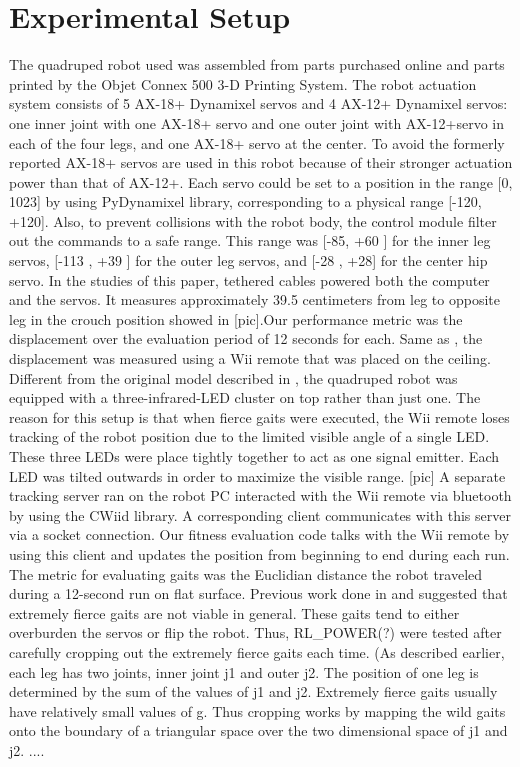 \section{Experimental Setup}

The quadruped robot used was assembled from parts purchased online and
parts printed by the Objet Connex 500 3-D Printing System. The robot
actuation system consists of 5 AX-18+ Dynamixel servos and 4 AX-12+
Dynamixel servos: one inner joint with one AX-18+ servo and one outer
joint with AX-12+servo in each of the four legs, and one AX-18+ servo
at the center. To avoid the formerly reported AX-18+ servos are used
in this robot because of their stronger actuation power than that of
AX-12+. Each servo could be set to a position in the range [0, 1023]
by using PyDynamixel library, corresponding to a physical range [-120,
  +120]. Also, to prevent collisions with the robot body, the control
module filter out the commands to a safe range. This range was [-85,
  +60 ] for the inner leg servos, [-113 , +39 ] for the outer leg
servos, and [-28 , +28] for the center hip servo. In the studies of
this paper, tethered cables powered both the computer and the
servos. It measures approximately 39.5 centimeters from leg to
opposite leg in the crouch position showed in [pic].Our performance
metric was the displacement over the evaluation period of 12 seconds
for each. Same as \cite{yosinski2011evolving-robot-gaits}, the displacement was
measured using a Wii remote that was placed on the ceiling. Different
from the original model described in \cite{yosinski2011evolving-robot-gaits}, the quadruped robot was
equipped with a three-infrared-LED cluster on top rather than just
one. The reason for this setup is that when fierce gaits were
executed, the Wii remote loses tracking of the robot position due to
the limited visible angle of a single LED.  These three LEDs were
place tightly together to act as one signal emitter. Each LED was
tilted outwards in order to maximize the visible range. [pic] A
separate tracking server ran on the robot PC interacted with the Wii
remote via bluetooth by using the CWiid library.  A corresponding
client communicates with this server via a socket connection. Our
fitness evaluation code talks with the Wii remote by using this client
and updates the position from beginning to end during each run. The
metric for evaluating gaits was the Euclidian distance the robot
traveled during a 12-second run on flat surface. Previous work done in
\cite{yosinski2011evolving-robot-gaits} and \cite{clune2009evolving-coordinated-quadruped} suggested that extremely fierce gaits are not viable in
general. These gaits tend to either overburden the servos or flip the
robot. Thus, RL\_POWER(?) were tested after carefully cropping out the
extremely fierce gaits each time. (As described earlier, each leg has
two joints, inner joint j1 and outer j2. The position of one leg is
determined by the sum of the values of j1 and j2. Extremely fierce
gaits usually have relatively small values of g. Thus cropping works
by mapping the wild gaits onto the boundary of a triangular space over
the two dimensional space of j1 and j2. ....


